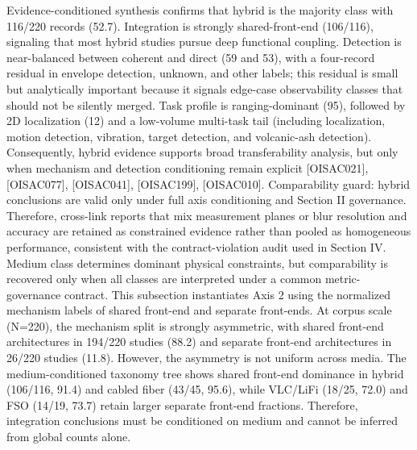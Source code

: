 {}Evidence-conditioned synthesis confirms that hybrid is the majority class with 116/220 records (52.7\markdownRendererPercentSign{}). Integration is strongly shared-front-end (106/116), signaling that most hybrid studies pursue deep functional coupling. Detection is near-balanced between coherent and direct (59 and 53), with a four-record residual in envelope detection, unknown, and other labels; this residual is small but analytically important because it signals edge-case observability classes that should not be silently merged. Task profile is ranging-dominant (95), followed by 2D localization (12) and a low-volume multi-task tail (including localization, motion detection, vibration, target detection, and volcanic-ash detection). Consequently, hybrid evidence supports broad transferability analysis, but only when mechanism and detection conditioning remain explicit [O\markdownRendererUnderscore{}ISAC\markdownRendererUnderscore{}021], [O\markdownRendererUnderscore{}ISAC\markdownRendererUnderscore{}077], [O\markdownRendererUnderscore{}ISAC\markdownRendererUnderscore{}041], [O\markdownRendererUnderscore{}ISAC\markdownRendererUnderscore{}199], [O\markdownRendererUnderscore{}ISAC\markdownRendererUnderscore{}010].\markdownRendererParagraphSeparator
{}Comparability guard: hybrid conclusions are valid only under full axis conditioning and Section II governance. Therefore, cross-link reports that mix measurement planes or blur resolution and accuracy are retained as constrained evidence rather than pooled as homogeneous performance, consistent with the contract-violation audit used in Section IV.\markdownRendererParagraphSeparator
{} Medium class determines dominant physical constraints, but comparability is recovered only when all classes are interpreted under a common metric-governance contract.\markdownRendererInterblockSeparator
{}\markdownRendererThematicBreak{}\markdownRendererInterblockSeparator
{}
\markdownRendererSectionEnd 
\markdownRendererSectionEnd \markdownRendererSectionBegin
{}\markdownRendererInterblockSeparator
{}This subsection instantiates Axis 2 using the normalized mechanism labels of shared front-end and separate front-ends. At corpus scale (N=220), the mechanism split is strongly asymmetric, with shared front-end architectures in 194/220 studies (88.2\markdownRendererPercentSign{}) and separate front-end architectures in 26/220 studies (11.8\markdownRendererPercentSign{}). However, the asymmetry is not uniform across media. The medium-conditioned taxonomy tree shows shared front-end dominance in hybrid (106/116, 91.4\markdownRendererPercentSign{}) and cabled fiber (43/45, 95.6\markdownRendererPercentSign{}), while VLC/LiFi (18/25, 72.0\markdownRendererPercentSign{}) and FSO (14/19, 73.7\markdownRendererPercentSign{}) retain larger separate front-end fractions. Therefore, integration conclusions must be conditioned on medium and cannot be inferred from global counts alone.\markdownRendererParagraphSeparator
